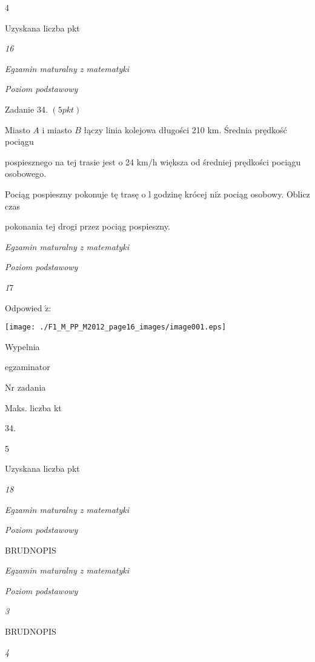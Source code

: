 \documentclass[a4paper,12pt]{article}
\begin{document}
4

Uzyskana liczba pkt





{\it 16}

{\it Egzamin maturalny z matematyki}

{\it Poziom podstawowy}

Zadanie 34. $(5pkt)$

Miasto $A$ i miasto $B$ łączy linia kolejowa długości 210 km. Średnia prędkość pociągu

pospiesznego na tej trasie jest o 24 $\mathrm{k}\mathrm{m}/\mathrm{h}$ większa od średniej prędkości pociągu osobowego.

Pociąg pospieszny pokonuje tę trasę o l godzinę krócej $\mathrm{n}\mathrm{i}\dot{\mathrm{z}}$ pociąg osobowy. Oblicz czas

pokonania tej drogi przez pociąg pospieszny.





{\it Egzamin maturalny z matematyki}

{\it Poziom podstawowy}

{\it 1}7

Odpowied $\acute{\mathrm{z}}$:
\begin{center}
\texttt{[image: ./F1\_M\_PP\_M2012\_page16\_images/image001.eps]}
\end{center}
Wypelnia

egzaminator

Nr zadania

Maks. liczba kt

34.

5

Uzyskana liczba pkt





{\it 18}

{\it Egzamin maturalny z matematyki}

{\it Poziom podstawowy}

BRUDNOPIS





{\it Egzamin maturalny z matematyki}

{\it Poziom podstawowy}

{\it 3}

BRUDNOPIS





{\it 4}
\end{document}
